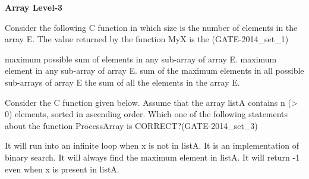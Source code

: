 \centerline{\textbf{ \LARGE Array Level-3}}

\begin{questyle}
  \question  Consider the following C function in which size is the number of elements in the array E.
            The value returned by the function MyX is the (GATE-2014\_set\_1)
            

  \begin{choices}
    \CorrectChoice  maximum possible sum of elements in any sub-array of array E.
    \choice         maximum element in any sub-array of array E.
    \choice         sum of the maximum elements in all possible sub-arrays of array E
    \choice         the sum of all the elements in the array E.
  \end{choices}
\end{questyle}



\begin{questyle}
  \question  Consider the C function given below. Assume that the array listA contains n (> 0) elements,
            sorted in ascending order.  Which one of the following statements about the
            function ProcessArray is CORRECT?(GATE-2014\_set\_3)
            

  \begin{choices}
    \choice         It will run into an infinite loop when x is not in listA.
    \CorrectChoice  It is an implementation of binary search.
    \choice         It will always find the maximum element in listA.
    \choice         It will return -1 even when x is present in listA.
  \end{choices}
\end{questyle}
